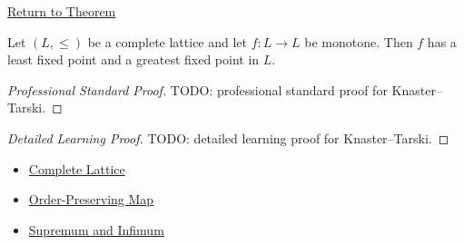 \newpage
{}
\label{prf:knaster-tarski}

\begin{remark*}[Return]
\hyperref[thm:knaster-tarski]{Return to Theorem}
\end{remark*}

\begin{theorem*}
Let $(L,\leq)$ be a complete lattice and let $f:L\to L$ be monotone. Then $f$
has a least fixed point and a greatest fixed point in $L$.
\end{theorem*}

\begin{proof}[Professional Standard Proof]
\LRAProofBodyStart
TODO: professional standard proof for Knaster--Tarski.
\end{proof}

\begin{proof}[Detailed Learning Proof]
\LRAProofBodyStart
TODO: detailed learning proof for Knaster--Tarski.
\end{proof}

\begin{remark*}
\end{remark*}

\begin{dependencies}
\begin{itemize}
  \item \hyperref[def:complete-lattice]{Complete Lattice}
  \item \hyperref[def:order-preserving-map-ordered-sets]{Order-Preserving Map}
  \item \hyperref[def:sup-inf]{Supremum and Infimum}
\end{itemize}
\end{dependencies}

\clearpage
